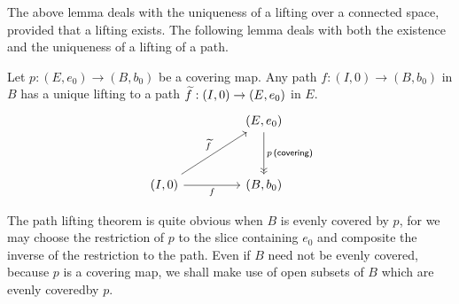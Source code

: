 The above lemma deals with the uniqueness of a lifting over a connected space, provided that a lifting exists.
The following lemma deals with both the existence and the uniqueness of a lifting of a path.
\begin{thm}
    Let $p: (E, e_0)\rightarrow (B, b_0)$ be a covering map.
    Any path $f: (I, 0)\rightarrow (B, b_0)$ in $B$ has a unique lifting to a path $\widetilde{f}: (I, 0)\rightarrow (E, e_0)$ in $E$.
    \begin{equation*}
    \begin{tikzcd}[row sep=1.2cm, column sep=1.6cm]
        &
        (E, e_0)
        \arrow[d, "p\,\textsf{(covering)}", ->>]
        \\
        (I, 0)
        \arrow[ur, "\wt{f}"]
        \arrow[r, "f"']
        &
        (B, b_0)
    \end{tikzcd}
    \end{equation*}
\end{thm}
\begin{rmk}
    The path lifting theorem is quite obvious when $B$ is evenly covered by $p$, for we may choose the restriction of $p$ to the slice containing $e_0$ and composite the inverse of the restriction to the path.
    Even if $B$ need not be evenly covered, because $p$ is a covering map, we shall make use of open subsets of $B$ which are evenly coveredby $p$.
\end{rmk}
